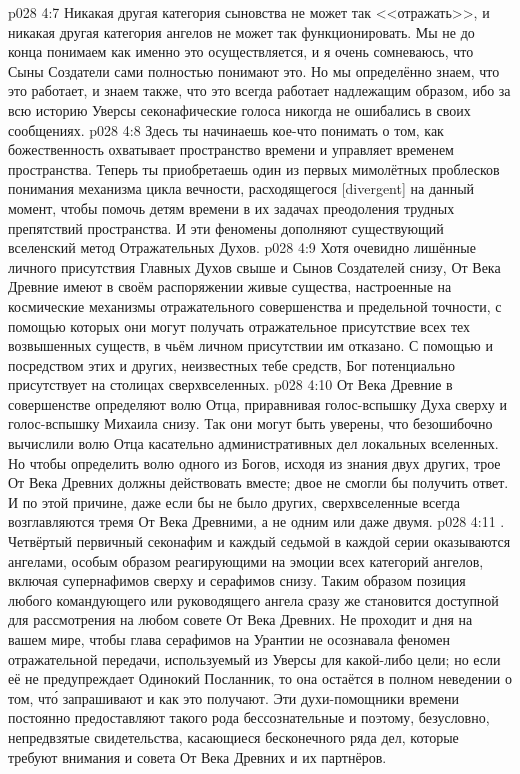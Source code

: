 \vs p028 4:7 Никакая другая категория сыновства не может так <<отражать>>, и никакая другая категория ангелов не может так функционировать. Мы не до конца понимаем как именно это осуществляется, и я очень сомневаюсь, что Сыны Создатели сами полностью понимают это. Но мы определённо знаем, что это работает, и знаем также, что это всегда работает надлежащим образом, ибо за всю историю Уверсы секонафические голоса никогда не ошибались в своих сообщениях.
\vs p028 4:8 Здесь ты начинаешь кое\hyp{}что понимать о том, как божественность охватывает пространство времени и управляет временем пространства. Теперь ты приобретаешь один из первых мимолётных проблесков понимания механизма цикла вечности, расходящегося [divergent] на данный момент, чтобы помочь детям времени в их задачах преодоления трудных препятствий пространства. И эти феномены дополняют существующий вселенский метод Отражательных Духов.
\vs p028 4:9 Хотя очевидно лишённые личного присутствия Главных Духов свыше и Сынов Создателей снизу, От Века Древние имеют в своём распоряжении живые существа, настроенные на космические механизмы отражательного совершенства и предельной точности, с помощью которых они могут получать отражательное присутствие всех тех возвышенных существ, в чьём личном присутствии им отказано. С помощью и посредством этих и других, неизвестных тебе средств, Бог потенциально присутствует на столицах сверхвселенных.
\vs p028 4:10 От Века Древние в совершенстве определяют волю Отца, приравнивая голос\hyp{}вспышку Духа сверху и голос\hyp{}вспышку Михаила снизу. Так они могут быть уверены, что безошибочно вычислили волю Отца касательно административных дел локальных вселенных. Но чтобы определить волю одного из Богов, исходя из знания двух других, трое От Века Древних должны действовать вместе; двое не смогли бы получить ответ. И по этой причине, даже если бы не было других, сверхвселенные всегда возглавляются тремя От Века Древними, а не одним или даже двумя.
\vs p028 4:11 . Четвёртый первичный секонафим и каждый седьмой в каждой серии оказываются ангелами, особым образом реагирующими на эмоции всех категорий ангелов, включая супернафимов сверху и серафимов снизу. Таким образом позиция любого командующего или руководящего ангела сразу же становится доступной для рассмотрения на любом совете От Века Древних. Не проходит и дня на вашем мире, чтобы глава серафимов на Урантии не осознавала феномен отражательной передачи, используемый из Уверсы для какой\hyp{}либо цели; но если её не предупреждает Одинокий Посланник, то она остаётся в полном неведении о том, чт\'о запрашивают и как это получают. Эти духи\hyp{}помощники времени постоянно предоставляют такого рода бессознательные и поэтому, безусловно, непредвзятые свидетельства, касающиеся бесконечного ряда дел, которые требуют внимания и совета От Века Древних и их партнёров.
